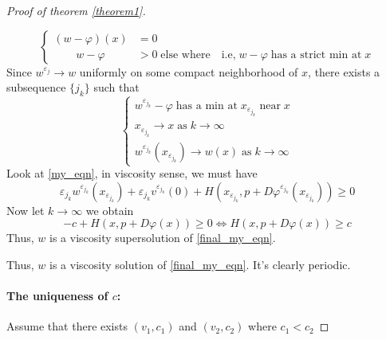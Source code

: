 \documentclass[12pt, oneside]{amsart}  	%
\begin{document}
\begin{proof}[Proof of theorem \ref{theorem1}]
\begin{itemize}
\begin{equation*}
\begin{cases}
(w - \varphi)(x) &= 0\\
\qquad w - \varphi &>0 \;\text{else where}\quad \text{i.e,}\; w-\varphi\;\text{has a strict min at}\; x
\end{cases}
\end{equation*}
Since $w^{\varepsilon_j}\longrightarrow w$ uniformly on some compact neighborhood of $x$, there exists a subsequence $\{j_k\}$ such that 
\begin{equation*}
\begin{cases}
w^{\varepsilon_{j_k}} - \varphi \;\text{has a min at}\; x_{\varepsilon_{j_k}}\;\text{near}\;x\\
x_{\varepsilon_{j_k}} \longrightarrow x \;\text{as}\; k\longrightarrow\infty\\
w^{\varepsilon_{j_k}}\left(x_{\varepsilon_{j_k}}\right) \longrightarrow w(x) \;\text{as}\; k\longrightarrow\infty
\end{cases}
\end{equation*}
Look at \eqref{my_eqn}, in viscosity sense, we must have
\begin{equation*}
\varepsilon_{j_k}
w^{\varepsilon_{j_k}}\left(x_{\varepsilon_{j_k}}\right) + 
\varepsilon_{j_k} v^{\varepsilon_{j_k}}(0) +
H(x_{\varepsilon_{j_k}},p+ D\varphi^{\varepsilon_{j_k}}(x_{\varepsilon_{j_k}})) \geq 0
\end{equation*}
Now let $k\longrightarrow \infty$ we obtain 
\begin{equation*}
-c + H(x,p+D\varphi(x)) \geq 0 \Longleftrightarrow H(x,p+D\varphi(x)) \geq c
\end{equation*}
Thus, $w$ is a viscosity supersolution of \eqref{final_my_eqn}.
\end{itemize}
Thus, $w$ is a viscosity solution of \eqref{final_my_eqn}. It's clearly periodic.\\


\paragraph{\textbf{The uniqueness of $c$:}} Assume that there exists $(v_1,c_1)$ and $(v_2,c_2)$ where $c_1<c_2$ 


\end{proof}
\end{document}

